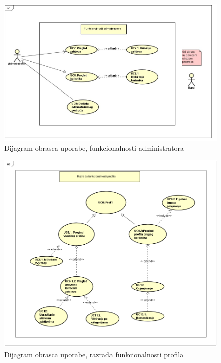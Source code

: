 \begin{figure}[H]
	\includegraphics[scale=0.6]{slike/uc_funkcionalnosti_administratora.jpg} %
	\centering
	\caption {Dijagram obrasca uporabe, funkcionalnosti administratora}
	\label{fig:promjene}
\end{figure}

\begin{figure}[H]
	\includegraphics[scale=0.65]{slike/uc_profil.png} %
	\centering
	\caption { Dijagram obrasca uporabe, razrada funkcionalnosti profila}
	\label{fig:promjene}
\end{figure}		

